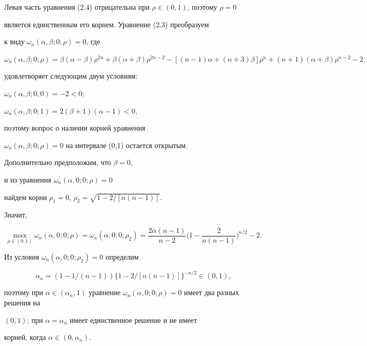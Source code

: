 Левая часть уравнения (2.4) отрицательна при $\rho\in(0,1)$, поэтому $\rho=0$


является единственным его корнем. Уравнение (2.3) преобразуем


к виду $\omega_n(\alpha,\beta;0;\rho)=0$, где


$\omega_n(\alpha,\beta;0;\rho)=


\beta(\alpha-\beta)\rho^{2n}+\beta


(\alpha+\beta)\rho^{2n-2}-[(n-1)\alpha+(n+3)\beta]\rho^n+(n+1)


(\alpha+\beta)\rho^{n-2}-2$


удовлетворяет следующим двум условиям:


$\omega_n(\alpha,\beta;0,0)=-2<0$;


$\omega_n(\alpha,\beta;0;1)=2(\beta+1)(\alpha-1)<0$,


поэтому вопрос о наличии корней уравнения


$\omega_n(\alpha,\beta;0;\rho)=0$ на интервале (0,1) остается открытым.


Дополнительно предположим, что $\beta=0$,


и из уравнения $\omega_n^\prime(\alpha,0;0;\rho)=0$


найдем корни $\rho_1=0$, $\rho_2=\sqrt{1-2/[n(n-1)]}$.


Значит,


$$


\max\limits_{\rho\in(0,1)}\omega_n(\alpha,0;0;\rho)=\omega_n


(\alpha,0;0;\rho_2)=\frac{2\alpha(n-1)}{n-2}\bigg(1-\frac


2{n(n-1)}\bigg)^{n/2}-2.


$$


Из условия $\omega_n(\alpha,0;0;\rho_2)=0$ определим


\begin{equation}


\alpha_n=(1-1/(n-1))\{1-2/[n(n-1)]\}^{-n/2} \in (0,1),


\end{equation}


поэтому при $\alpha\in(\alpha_n,1)$ уравнение $\omega_n(\alpha,0;


0;\rho)=0$ имеет два разных решения на


$(0,1)$; при $\alpha=\alpha_n$ имеет единственное решение и не имеет 


корней, когда $\alpha\in(0,\alpha_n)$.





